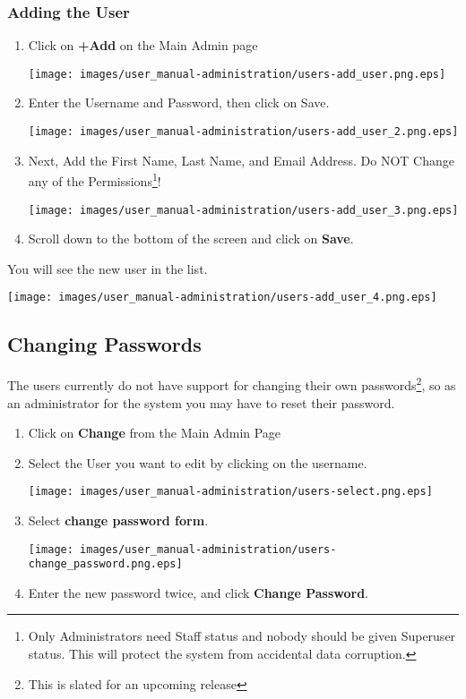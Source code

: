 \subsubsection{Adding the User}
\begin{enumerate}
\item Click on \textbf{+Add} on the Main Admin page

\texttt{[image: images/user\_manual-administration/users-add\_user.png.eps]}

\item Enter the Username and Password, then click on Save.

\texttt{[image: images/user\_manual-administration/users-add\_user\_2.png.eps]}

\item Next, Add the First Name, Last Name, and Email Address. Do NOT
Change any of the Permissions\footnote{Only Administrators need Staff status
and nobody should be given Superuser status. This will protect the
system from accidental data corruption.}!

\texttt{[image: images/user\_manual-administration/users-add\_user\_3.png.eps]}

\item Scroll down to the bottom of the screen and click on \textbf{Save}.
\end{enumerate}

You will see the new user in the list.

\texttt{[image: images/user\_manual-administration/users-add\_user\_4.png.eps]}

\subsection{Changing Passwords}

  The users currently do not have support for changing their own
passwords\footnote{This is slated for an upcoming release}, so as an
administrator for the system you may have to reset their password.

\begin{enumerate}
\item Click on \textbf{Change} from the Main Admin Page
\item Select the User you want to edit by clicking on the username.

\texttt{[image: images/user\_manual-administration/users-select.png.eps]}

\item Select \textbf{change password form}.

\texttt{[image: images/user\_manual-administration/users-change\_password.png.eps]}

\item Enter the new password twice, and click \textbf{Change Password}.
\end{enumerate}

